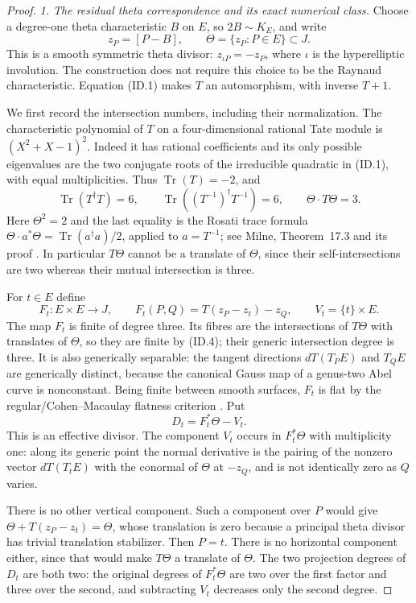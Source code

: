 \documentclass[11pt,a4paper]{article}
\begin{document}
\begin{proof}
\emph{1. The residual theta correspondence and its exact numerical class.}
Choose a degree-one theta characteristic $B$ on $E$, so $2B\sim K_E$,
and write
\[
             z_P=[P-B],\qquad \Theta=\{z_P:P\in E\}\subset J.
 \tag{ID.3}
\]
This is a smooth symmetric theta divisor: $z_{\iota P}=-z_P$,
where $\iota$ is the hyperelliptic involution. The construction
does not require this choice to be the Raynaud characteristic.
Equation (ID.1) makes $T$ an automorphism, with inverse $T+1$.

We first record the intersection numbers, including their
normalization. The characteristic polynomial of $T$ on a
four-dimensional rational Tate module is $(X^2+X-1)^2$.
Indeed it has rational coefficients and its only possible
eigenvalues are the two conjugate roots of the irreducible
quadratic in (ID.1), with equal multiplicities. Thus
$\operatorname{Tr}(T)=-2$, and
\[
 \operatorname{Tr}(T^\dagger T)=6,
 \qquad
 \operatorname{Tr}((T^{-1})^\dagger T^{-1})=6,
 \qquad \Theta\cdot T\Theta=3.
 \tag{ID.4}
\]
Here $\Theta^2=2$ and the last equality is the Rosati trace
formula $\Theta\cdot a^*\Theta=\operatorname{Tr}(a^\dagger a)/2$,
applied to $a=T^{-1}$; see Milne, Theorem~17.3 and its proof
\cite[pp.~35--36]{MilneAV}. In particular $T\Theta$ cannot
be a translate of $\Theta$, since their self-intersections
are two whereas their mutual intersection is three.

For $t\in E$ define
\[
 F_t:E\times E\longrightarrow J,
       \qquad F_t(P,Q)=T(z_P-z_t)-z_Q,
 \qquad V_t=\{t\}\times E.
 \tag{ID.5}
\]
The map $F_t$ is finite of degree three. Its fibres are the
intersections of $T\Theta$ with translates of $\Theta$, so
they are finite by (ID.4); their generic intersection degree
is three. It is also generically separable: the tangent
directions $dT(T_P E)$ and $T_Q E$ are generically distinct,
because the canonical Gauss map of a genus-two Abel curve
is nonconstant. Being finite between smooth surfaces, $F_t$
is flat by the regular/Cohen--Macaulay flatness criterion
\cite[Lemma~10.128.1, Tag~\texttt{00R4}]{Stacks00R4}.
Put
\[
                  D_t=F_t^*\Theta-V_t.
 \tag{ID.6}
\]
This is an effective divisor. The component $V_t$ occurs in
$F_t^*\Theta$ with multiplicity one: along its generic point
the normal derivative is the pairing of the nonzero vector
$dT(T_tE)$ with the conormal of $\Theta$ at $-z_Q$, and is
not identically zero as $Q$ varies.

There is no other vertical component. Such a component over
$P$ would give $\Theta+T(z_P-z_t)=\Theta$, whose translation
is zero because a principal theta divisor has trivial
translation stabilizer. Then $P=t$. There is no horizontal
component either, since that would make $T\Theta$ a translate
of $\Theta$. The two projection degrees of $D_t$ are both two:
the original degrees of $F_t^*\Theta$ are two over the first
factor and three over the second, and subtracting $V_t$
decreases only the second degree.


\end{proof}
\end{document}
